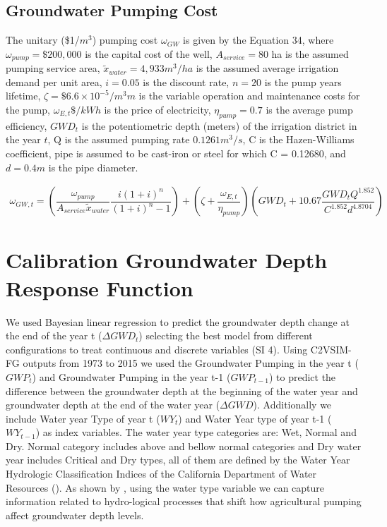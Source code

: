 \documentclass[11pt,a4paper]{article}
\begin{document}
\subsection{Groundwater Pumping Cost}

The unitary (\$1/$m^3$) pumping cost $\omega_{GW}$ is given by the Equation 34, where $\omega_{pump}= \$200,000$ is the capital cost of the well, $A_{service}=80$ ha is the assumed pumping service area, $\widetilde{x}_{water}=4,933 m^3/ ha$ is the assumed average irrigation demand per unit area, $i=0.05$ is the discount rate, $n=20$ is the pump years lifetime, $\zeta= \$6.6\times10^{-5} /m^3 m$ is the variable operation and maintenance costs for the pump, $\omega_{E,t} \$/kWh$ is the price of electricity, $\eta_{pump}=0.7$ is the average pump efficiency, $GWD_t$ is the potentiometric depth (meters) of the irrigation district in the year $t$, Q is the assumed pumping rate $0.1261 m^3/s$, C is the Hazen-Williams coefficient, pipe is assumed to be cast-iron or steel for which C = 0.12680, and $d=0.4 m$ is the pipe diameter.

\begin{equation}
\begin{gathered}
\omega_{GW,t} = \left( \dfrac{\omega_{pump}}{A_{service} \widetilde{x}_{water}} \dfrac{i(1+i)^n}{(1+i)^n-1}\right) 
+ \left(\zeta+\dfrac{\omega_{E,t}}{\eta_{pump}} \right) \left(GWD_t +10.67  \dfrac{GWD_t Q^{1.852}}{C^{1.852} d^{4.8704}}\right)
\end{gathered}
\end{equation}            

\setcounter{figure}{0} 
\setcounter{equation}{0} 
\setcounter{table}{0} 


\section{Calibration Groundwater Depth Response Function}

We used Bayesian linear regression to predict the groundwater depth change at the end of the year t ($\Delta GWD_{t}$) selecting the best model from different configurations to treat continuous and discrete variables (SI 4). Using C2VSIM-FG outputs from 1973 to 2015 we used the Groundwater Pumping in the year t ($GWP_{t}$) and Groundwater Pumping in the year t-1 ($GWP_{t-1}$) to predict  the difference between the groundwater depth at the beginning of the water year and groundwater depth at the end of the water year ($\Delta{GWD}$). Additionally we include Water year Type of year t ($WY_{t}$) and Water Year type of year t-1 ($WY_{t-1}$) as index variables. The water year type categories are: Wet, Normal and Dry. Normal category includes above and bellow normal categories and Dry water year includes Critical and Dry types, all of them are defined by the Water Year Hydrologic Classification Indices of the California Department of Water Resources (\cite{dwr_california_2020}). As shown by \textcite{macewan_hydroeconomic_2017}, using the water type variable we can capture information related to hydro-logical processes that shift how agricultural pumping affect groundwater depth levels.
\end{document}
